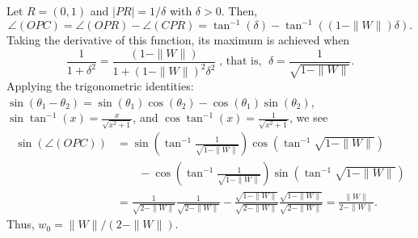 \documentclass[11pt]{article}
\begin{document}
{Let  $R=(0,1)$ and $|PR| = 1/\delta$ with $\delta>0$. 
Then, 
\[
\angle(OPC)=\angle(OPR)-\angle(CPR)=\tan^{-1}(\delta)-\tan^{-1}\left((1-\|W\|)\delta\right).
\]
Taking the derivative of this  function, its maximum is achieved when 
\[
\frac{1}{1+\delta^2}=\frac{(1-\|W\|)}{1+(1-\|W\|)^2\delta^2}\;
\text{, that is, }\; \delta=\frac{1}{\sqrt{1-\|W\|}}.
\]
Applying the trigonometric identities: $\sin(\theta_1 -\theta_2) = \sin(\theta_1)\cos(\theta_2) - \cos(\theta_1)\sin(\theta_2)$, $\sin\tan^{-1}(x)=\frac{x}{\sqrt{x^2+1}}$, and $\cos\tan^{-1}(x)=\frac{1}{\sqrt{x^2+1}}$, we see
\begin{align}
\sin(\angle(OPC))&=\sin\left(\tan^{-1}\frac{1}{\sqrt{1-\|W\|}}\right)\cos(\tan^{-1}{\sqrt{1-\|W\|}}) \nonumber\\
&\;\;\;\;\;\;\;-\cos\left(\tan^{-1}\frac{1}{\sqrt{1-\|W\|}}\right)\sin(\tan^{-1}{\sqrt{1-\|W\|}}) \nonumber \\ 
&=\frac{1}{\sqrt{2-\|W\|}}\frac{1}{\sqrt{2-\|W\|}}-\frac{\sqrt{1-\|W\|}}{\sqrt{2-\|W\|}}\frac{\sqrt{1-\|W\|}}{\sqrt{2-\|W\|}}=\frac{\|W\|}{2-\|W\|}. \nonumber 
\end{align}
Thus, $w_0 =\|W\|/(2-\|W\|)$. 

}
\end{document}
